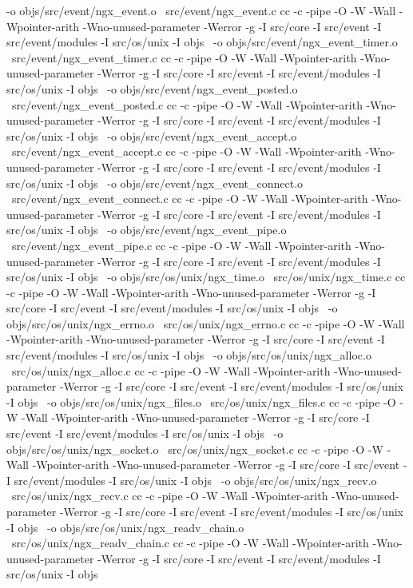	-o objs/src/event/ngx_event.o \
	src/event/ngx_event.c
cc -c -pipe  -O -W -Wall -Wpointer-arith -Wno-unused-parameter -Werror -g  -I src/core -I src/event -I src/event/modules -I src/os/unix -I objs \
	-o objs/src/event/ngx_event_timer.o \
	src/event/ngx_event_timer.c
cc -c -pipe  -O -W -Wall -Wpointer-arith -Wno-unused-parameter -Werror -g  -I src/core -I src/event -I src/event/modules -I src/os/unix -I objs \
	-o objs/src/event/ngx_event_posted.o \
	src/event/ngx_event_posted.c
cc -c -pipe  -O -W -Wall -Wpointer-arith -Wno-unused-parameter -Werror -g  -I src/core -I src/event -I src/event/modules -I src/os/unix -I objs \
	-o objs/src/event/ngx_event_accept.o \
	src/event/ngx_event_accept.c
cc -c -pipe  -O -W -Wall -Wpointer-arith -Wno-unused-parameter -Werror -g  -I src/core -I src/event -I src/event/modules -I src/os/unix -I objs \
	-o objs/src/event/ngx_event_connect.o \
	src/event/ngx_event_connect.c
cc -c -pipe  -O -W -Wall -Wpointer-arith -Wno-unused-parameter -Werror -g  -I src/core -I src/event -I src/event/modules -I src/os/unix -I objs \
	-o objs/src/event/ngx_event_pipe.o \
	src/event/ngx_event_pipe.c
cc -c -pipe  -O -W -Wall -Wpointer-arith -Wno-unused-parameter -Werror -g  -I src/core -I src/event -I src/event/modules -I src/os/unix -I objs \
	-o objs/src/os/unix/ngx_time.o \
	src/os/unix/ngx_time.c
cc -c -pipe  -O -W -Wall -Wpointer-arith -Wno-unused-parameter -Werror -g  -I src/core -I src/event -I src/event/modules -I src/os/unix -I objs \
	-o objs/src/os/unix/ngx_errno.o \
	src/os/unix/ngx_errno.c
cc -c -pipe  -O -W -Wall -Wpointer-arith -Wno-unused-parameter -Werror -g  -I src/core -I src/event -I src/event/modules -I src/os/unix -I objs \
	-o objs/src/os/unix/ngx_alloc.o \
	src/os/unix/ngx_alloc.c
cc -c -pipe  -O -W -Wall -Wpointer-arith -Wno-unused-parameter -Werror -g  -I src/core -I src/event -I src/event/modules -I src/os/unix -I objs \
	-o objs/src/os/unix/ngx_files.o \
	src/os/unix/ngx_files.c
cc -c -pipe  -O -W -Wall -Wpointer-arith -Wno-unused-parameter -Werror -g  -I src/core -I src/event -I src/event/modules -I src/os/unix -I objs \
	-o objs/src/os/unix/ngx_socket.o \
	src/os/unix/ngx_socket.c
cc -c -pipe  -O -W -Wall -Wpointer-arith -Wno-unused-parameter -Werror -g  -I src/core -I src/event -I src/event/modules -I src/os/unix -I objs \
	-o objs/src/os/unix/ngx_recv.o \
	src/os/unix/ngx_recv.c
cc -c -pipe  -O -W -Wall -Wpointer-arith -Wno-unused-parameter -Werror -g  -I src/core -I src/event -I src/event/modules -I src/os/unix -I objs \
	-o objs/src/os/unix/ngx_readv_chain.o \
	src/os/unix/ngx_readv_chain.c
cc -c -pipe  -O -W -Wall -Wpointer-arith -Wno-unused-parameter -Werror -g  -I src/core -I src/event -I src/event/modules -I src/os/unix -I objs \
